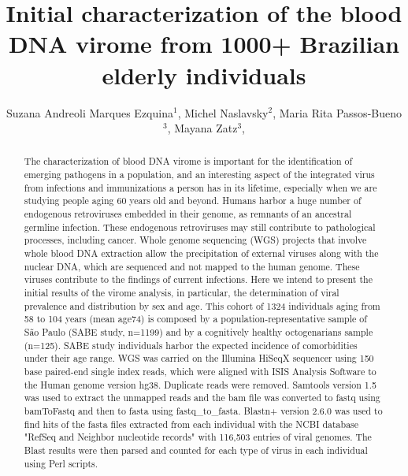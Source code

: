 \documentclass[twoside]{article}
\title{\vspace{-15mm}\fontsize{24pt}{10pt}\selectfont\textbf{ Initial characterization of the blood DNA virome from 1000+ Brazilian elderly individuals }} %
\author{ Suzana Andreoli Marques Ezquina$^{1}$, Michel Naslavsky$^{2}$, Maria Rita Passos-Bueno$^{3}$, Mayana Zatz$^{3}$, }
\affil{ 1 Centro de estudos do Genoma Humano - CEGH -USP

2 Centro de Estudos do Genoma Humano - CEGH - USP

3 Centro de Estudos do Genoma Humano - CEGH -USP

 }
\date{}
\begin{document}
  
  
  \maketitle %
  
  
  \thispagestyle{fancy} %
  
  
  \begin{abstract}
  The characterization of blood DNA virome is important for the identification of emerging pathogens in a population, and an interesting aspect of the integrated virus from infections and immunizations a person has in its lifetime, especially when we are studying people aging 60 years old and beyond.  Humans harbor a huge number of endogenous retroviruses embedded in their genome, as remnants of an ancestral germline infection. These endogenous retroviruses may still contribute to pathological processes, including cancer. Whole genome sequencing (WGS) projects that involve whole blood DNA extraction allow the precipitation of external viruses along with the nuclear DNA, which are sequenced and not mapped to the human genome. These viruses contribute to the findings of current infections. Here we intend to present the initial results of the virome analysis, in particular, the determination of viral prevalence and distribution by sex and age.
This cohort of 1324 individuals aging from 58 to 104 years (mean age74) is composed by a population-representative sample of S\~ao Paulo (SABE study, n=1199) and by a cognitively healthy octogenarians sample (n=125). SABE study individuals harbor the expected incidence of comorbidities under their age range.
WGS was carried on the Illumina HiSeqX sequencer using 150 base paired-end single index reads, which were aligned with ISIS Analysis Software to the Human genome version hg38. Duplicate reads were removed. Samtools version 1.5 was used to extract the unmapped reads and the bam file was converted to fastq using bamToFastq and then to fasta using fastq\_to\_fasta. 
Blastn+ version 2.6.0 was used to find hits of the fasta files extracted from each individual with the NCBI database "RefSeq and Neighbor nucleotide records" with 116,503 entries of viral genomes. The Blast results were then parsed and counted for each type of virus in each individual using Perl scripts.

\end{abstract}
\end{document}
